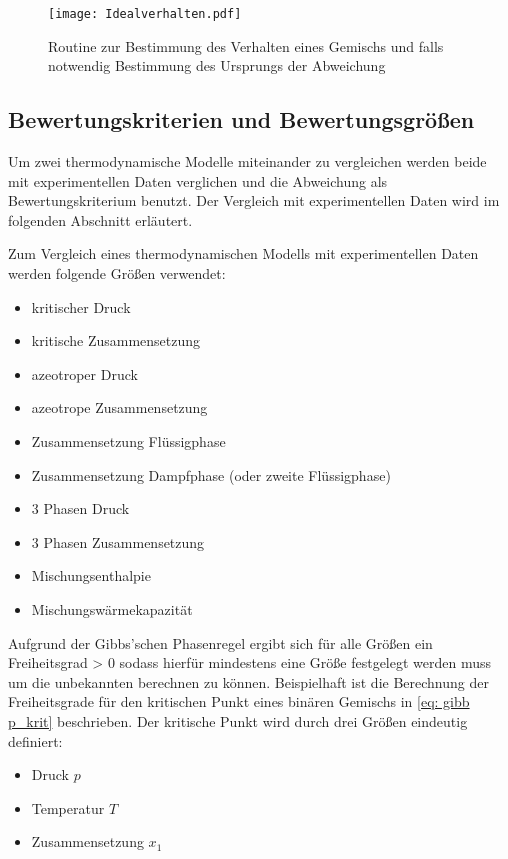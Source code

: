 \documentclass[../thesis.tex]{subfiles}
\begin{document}
\begin{figure}[htbp]
	\centering
	\texttt{[image: Idealverhalten.pdf]}
	\caption{Routine zur Bestimmung des Verhalten eines Gemischs und falls notwendig Bestimmung des Ursprungs der Abweichung}
	\label{fig: klassifikation}
\end{figure}

\subsection{Bewertungskriterien und Bewertungsgrößen}

Um zwei thermodynamische Modelle miteinander zu vergleichen werden beide mit experimentellen Daten verglichen und die Abweichung als Bewertungskriterium benutzt. Der Vergleich mit experimentellen Daten wird im folgenden Abschnitt erläutert.

Zum Vergleich eines thermodynamischen Modells mit experimentellen Daten werden folgende Größen verwendet:
\begin{itemize}
	\item kritischer Druck
	\item kritische Zusammensetzung
	\item azeotroper Druck
	\item azeotrope Zusammensetzung
	\item Zusammensetzung Flüssigphase
	\item Zusammensetzung Dampfphase (oder zweite Flüssigphase)
	\item 3 Phasen Druck
	\item 3 Phasen Zusammensetzung
	\item Mischungsenthalpie
	\item Mischungswärmekapazität
\end{itemize}

Aufgrund der Gibbs'schen Phasenregel ergibt sich für alle Größen ein Freiheitsgrad > 0 sodass hierfür mindestens eine Größe festgelegt werden muss um die unbekannten berechnen zu können. Beispielhaft ist die Berechnung der Freiheitsgrade für den kritischen Punkt eines binären Gemischs in \autoref{eq: gibb p_krit} beschrieben.
Der kritische Punkt wird durch drei Größen eindeutig definiert:
\begin{itemize}
	\item Druck $p$
	\item Temperatur $T$
	\item Zusammensetzung $x_1$
\end{itemize}
\end{document}

